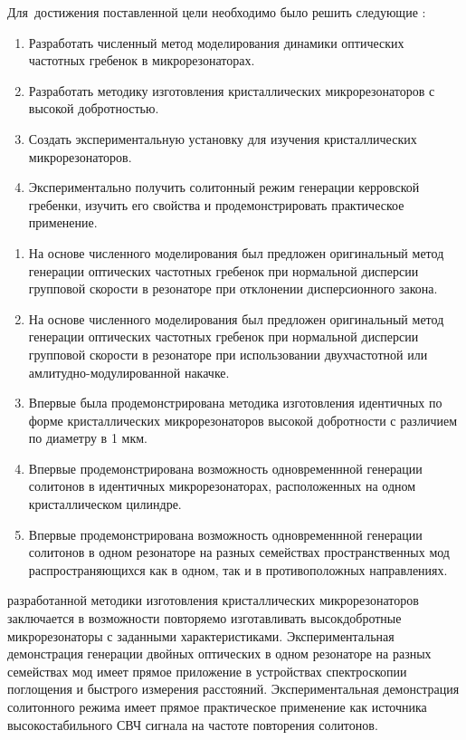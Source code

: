 Для~достижения поставленной цели необходимо было решить следующие {\tasks}:
\begin{enumerate}
  \item Разработать численный метод моделирования динамики оптических частотных гребенок в микрорезонаторах.
  \item Разработать методику изготовления кристаллических микрорезонаторов с высокой добротностью.
  \item Создать экспериментальную установку для изучения кристаллических микрорезонаторов.
  \item Экспериментально получить солитонный режим генерации керровской гребенки, изучить его свойства и продемонстрировать практическое применение.
\end{enumerate}

{\novelty}
\begin{enumerate}
  \item На основе численного моделирования был предложен оригинальный метод генерации оптических частотных гребенок при нормальной дисперсии групповой скорости в резонаторе при отклонении дисперсионного закона.
  \item На основе численного моделирования был предложен оригинальный метод генерации оптических частотных гребенок при нормальной дисперсии групповой скорости в резонаторе при использовании двухчастотной или амлитудно-модулированной накачке.
  \item Впервые была продемонстрирована методика изготовления идентичных по форме кристаллических микрорезонаторов высокой добротности с различием по диаметру в 1 мкм.
  \item Впервые продемонстрирована возможность одновременнной генерации солитонов в идентичных микрорезонаторах, расположенных на одном кристаллическом цилиндре.
  \item Впервые продемонстрирована возможность одновременнной генерации солитонов в одном резонаторе на разных семействах пространственных мод распространяющихся как в одном, так и в противоположных направлениях. 
\end{enumerate}

{\influence} разработанной методики изготовления кристаллических микрорезонаторов заключается в возможности повторяемо изготавливать высокдобротные микрорезонаторы с заданными характеристиками. Экспериментальная демонстрация генерации двойных оптических в одном резонаторе на разных семействах мод имеет прямое приложение в устройствах спектроскопии поглощения и быстрого измерения расстояний. Экспериментальная демонстрация солитонного режима имеет прямое практическое применение как источника высокостабильного СВЧ сигнала на частоте повторения солитонов.

